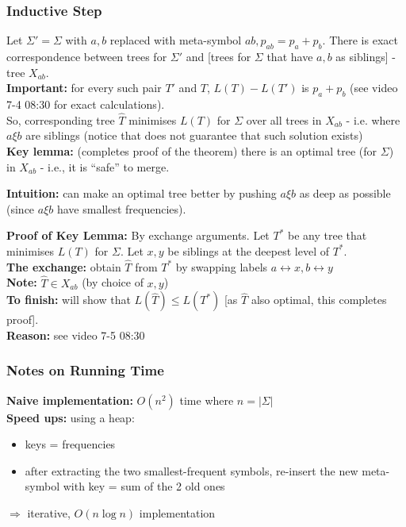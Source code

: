 \documentclass{scrartcl}
\begin{document}
\subsubsection{Inductive Step}
\label{sec:7-4-1}
Let $\Sigma' = \Sigma$ with $a, b$ replaced with meta-symbol $ab, p_{ab}=p_a +
p_b$. There is exact correspondence between trees for $\Sigma'$ and [trees for
$\Sigma$ that have $a, b$ as siblings] - tree $X_{ab}$.\\

{\bf Important: } for every such pair $T'$ and $T$, $L(T)-L(T')$ is $p_a + p_b$
(see video 7-4 08:30 for exact calculations).\\
So, corresponding tree $\hat{T}$ minimises $L(T)$ for $\Sigma$ over all trees in
$X_{ab}$ - i.e. where $a \xi b$ are siblings (notice that does not guarantee
that such solution exists)\\

{\bf Key lemma: } (completes proof of the theorem) there is an optimal tree (for
$\Sigma$) in $X_{ab}$ - i.e., it is ``safe'' to merge.

{\bf Intuition: } can make an optimal tree better by pushing $a \xi b$ as deep
as possible (since $a \xi b$ have smallest frequencies).

{\bf Proof of Key Lemma: } By exchange arguments. Let $T^*$ be any tree that
minimises $L(T)$ for $\Sigma$. Let $x, y$ be siblings at the deepest level of
$T^*$.\\
{\bf The exchange: } obtain $\hat{T}$ from $T^*$ by swapping labels $a
\leftrightarrow x, b \leftrightarrow y$\\
{\bf Note: } $\hat{T} \in X_{ab}$ (by choice of $x, y$)\\
{\bf To finish: } will show that $L(\hat{T}) \leq L(T^*)$ [as $\hat{T}$ also
optimal, this completes proof].\\
{\bf Reason: } see video 7-5 08:30

\subsubsection{Notes on Running Time}
\label{sec:7-4-2}
{\bf Naive implementation: } $O(n^2)$ time where $n=|\Sigma|$\\
{\bf Speed ups: } using a heap:
\begin{itemize}
\item keys = frequencies
\item after extracting the two smallest-frequent symbols, re-insert the new
  meta-symbol with key = sum of the 2 old ones
\end{itemize}
$\Rightarrow$ iterative, $O(n \log n)$ implementation
\end{document}

